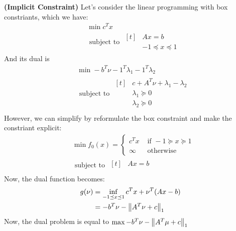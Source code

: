 \begin{definition}{\textbf{(Implicit Constraint)}}
    Let's consider the linear programming with box constriants, which we have:
    \begin{equation*}
    \begin{aligned}
        &\min c^Tx \\
        &\text{ subject to } \begin{aligned}[t]
            &Ax = b \\
            &-1\preceq x \preceq 1
        \end{aligned}
    \end{aligned}
    \end{equation*}
    And its dual is 
    \begin{equation*}
    \begin{aligned}
        &\min -b^T\nu - 1^T\lambda_1 - 1^T\lambda_2 \\
        &\text{ subject to } \begin{aligned}[t]
            &c+A^T\nu + \lambda_1 - \lambda_2 \\
            &\lambda_1\succeq0 \\
            &\lambda_2\succeq0 \\
        \end{aligned}
    \end{aligned}
    \end{equation*}
    However, we can simplify by reformulate the box constraint and make the constriant explicit: 
    \begin{equation*}
    \begin{aligned}
        &\min f_0(x) = \begin{cases}
            c^Tx &\text{ if } -1\succeq x\succeq 1\\
            \infty &\text{ otherwise }
        \end{cases} \\
        &\text{ subject to } \begin{aligned}[t]
            &Ax=b\\
        \end{aligned}
    \end{aligned}
    \end{equation*}
    Now, the dual function becomes:
    \begin{equation*}
    \begin{aligned}
        g(\nu) &= \inf_{-1\preceq x\preceq 1} c^Tx + \nu^T(Ax-b)\\ 
        &=-b^T\nu - \left\lVert A^T\nu + c\right\rVert_1
    \end{aligned}
    \end{equation*}
    Now, the dual problem is equal to $\max -b^T\nu - \left\lVert A^T\mu +c\right\rVert_1 $
\end{definition}

